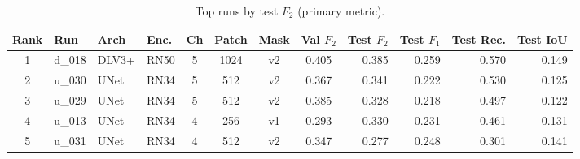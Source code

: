\begin{table}[htbp]
  \centering
  \caption{Top runs by test $F_2$ (primary metric).}
  \label{tab:top_runs}
  \begin{tabular}{clllccccrrrr}
    \toprule
    \textbf{Rank} & \textbf{Run} & \textbf{Arch} & \textbf{Enc.} & \textbf{Ch} & \textbf{Patch} & \textbf{Mask} & \textbf{Val $F_2$} & \textbf{Test $F_2$} & \textbf{Test $F_1$} & \textbf{Test Rec.} & \textbf{Test IoU} \\
    \midrule
    1 & d\_018 & DLV3+ & RN50 & 5 & 1024 & v2 & 0.405 & 0.385 & 0.259 & 0.570 & 0.149 \\
    2 & u\_030 & UNet  & RN34 & 5 & 512  & v2 & 0.367 & 0.341 & 0.222 & 0.530 & 0.125 \\
    3 & u\_029 & UNet  & RN34 & 5 & 512  & v2 & 0.385 & 0.328 & 0.218 & 0.497 & 0.122 \\
    4 & u\_013 & UNet  & RN34 & 4 & 256  & v1 & 0.293 & 0.330 & 0.231 & 0.461 & 0.131 \\
    5 & u\_031 & UNet  & RN34 & 4 & 512  & v2 & 0.347 & 0.277 & 0.248 & 0.301 & 0.141 \\
    \bottomrule
  \end{tabular}
\end{table}
